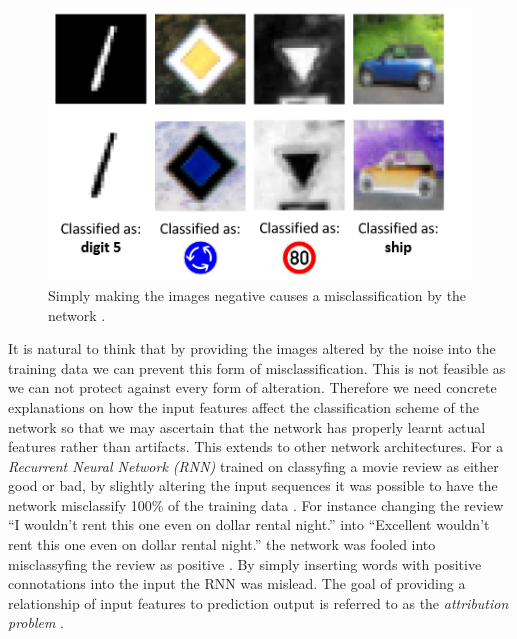 \begin  {figure}[!htpb]
  \includegraphics[width=\linewidth]{Introduction_Images/NN-negative.png}
   \caption {Simply making the images negative causes a misclassification by the network \cite{DBLP:journals/corr/HosseiniP17}.}
    \label{fig:negative-nn}
\end{figure}
It is natural to think that by providing the images altered by the noise into the training data we can prevent this form of misclassification. This is not feasible as we can not protect against every form of alteration. Therefore we need concrete explanations on how the input features affect the classification scheme of the network so that we may ascertain that the network has properly learnt actual features rather than artifacts. This extends to other network architectures. For a \emph{Recurrent Neural Network (RNN)} \cite{DBLP:journals/corr/Schmidhuber14} trained on classyfing a movie review as either good or bad, by slightly altering the input sequences it was possible to have the network misclassify 100\% of the training data \cite{DBLP:journals/corr/PapernotMSH16}. For instance changing the review “I  wouldn’t  rent  this  one  even  on  dollar  rental  night.”  into  “Excellent wouldn’t  rent  this  one  even  on  dollar  rental  night.” the network was fooled into misclassyfing the review as positive \cite{DBLP:journals/corr/PapernotMSH16}.  By simply inserting words with positive connotations into the input the RNN was mislead. The goal of providing a relationship of input features to prediction output is referred to as the \emph{attribution problem} \cite{DBLP:journals/corr/SundararajanTY17}.

